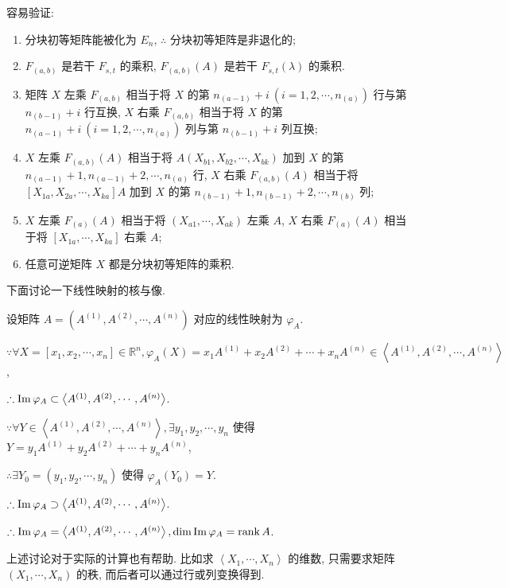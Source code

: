 \documentclass{ctexart}
\begin{document}
容易验证:
\begin{theorem}
    \begin{enumerate}
        \def\labelenumi{(\arabic{enumi})}
        \item 分块初等矩阵能被化为 $E_n$, $\therefore$ 分块初等矩阵是非退化的;
        \item $F_{(a,b)}$ 是若干 $F_{s,t}$ 的乘积, $F_{(a,b)}(A)$ 是若干 $F_{s,t}(\lambda)$ 的乘积.
        \item 矩阵 $X$ 左乘 $F_{(a,b)}$ 相当于将 $X$ 的第 $n_{(a-1)}+i\ (i=1,2,\cdots,n_{(a)})$ 行与第 $n_{(b-1)}+i$ 行互换, $X$ 右乘 $F_{(a,b)}$ 相当于将 $X$ 的第 $n_{(a-1)}+i\ (i=1,2,\cdots,n_{(a)})$ 列与第 $n_{(b-1)}+i$ 列互换;
        \item $X$ 左乘 $F_{(a,b)}(A)$ 相当于将 $A(X_{b1},X_{b2},\cdots,X_{bk})$ 加到 $X$ 的第 $n_{(a-1)}+1,n_{(a-1)}+2,\cdots,n_{(a)}$ 行, $X$ 右乘 $F_{(a,b)}(A)$ 相当于将 $[X_{1a},X_{2a},\cdots,X_{ka}]A$ 加到 $X$ 的第 $n_{(b-1)}+1,n_{(b-1)}+2,\cdots,n_{(b)}$ 列;
        \item $X$ 左乘 $F_{(a)}(A)$ 相当于将 $(X_{a1},\cdots,X_{ak})$ 左乘 $A$, $X$ 右乘 $F_{(a)}(A)$ 相当于将 $[X_{1a},\cdots,X_{ka}]$ 右乘 $A$;
        \item 任意可逆矩阵 $X$ 都是分块初等矩阵的乘积.
    \end{enumerate}
\end{theorem}

下面讨论一下线性映射的核与像.

设矩阵 $A=(A^{(1)},A^{(2)},\cdots,A^{(n)})$ 对应的线性映射为 $\varphi_A$.

$\because\forall X=[x_1,x_2,\cdots,x_n]\in\mathbb{R}^n,\varphi_A(X)=x_1A^{(1)}+x_2A^{(2)}+\cdots+x_nA^{(n)}\in\left<A^{(1)},A^{(2)},\cdots,A^{(n)}\right>$,

$\therefore\operatorname{Im} \varphi_A\subset\left<A^{(1)},A^{(2)},\cdots,A^{(n)}\right>$.

$\because\forall Y\in\left<A^{(1)},A^{(2)},\cdots,A^{(n)}\right>,\exists y_1,y_2,\cdots,y_n$ 使得 $Y=y_1A^{(1)}+y_2A^{(2)}+\cdots+y_nA^{(n)}$,

$\therefore\exists Y_0=(y_1,y_2,\cdots,y_n)$ 使得 $\varphi_A(Y_0)=Y$.

$\therefore\operatorname{Im} \varphi_A\supset\left<A^{(1)},A^{(2)},\cdots,A^{(n)}\right>$.

$\therefore\operatorname{Im} \varphi_A=\left<A^{(1)},A^{(2)},\cdots,A^{(n)}\right>,\dim\operatorname{Im} \varphi_A=\operatorname{rank} A$.

上述讨论对于实际的计算也有帮助. 比如求 $\left<X_1,\cdots,X_n\right>$ 的维数, 只需要求矩阵 $(X_1,\cdots,X_n)$ 的秩, 而后者可以通过行或列变换得到.
\end{document}
